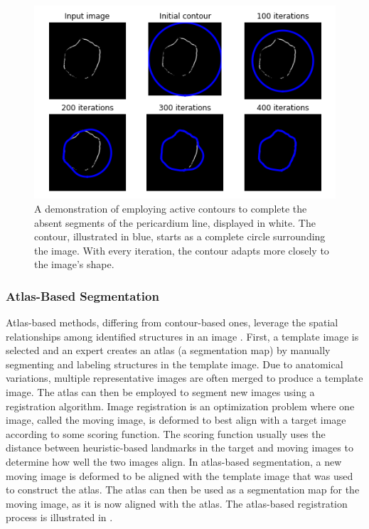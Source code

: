  \begin{figure}[t!]
 \centering
 \includegraphics[width=0.65\linewidth]{images/active_contour.png}
 \caption{A demonstration of employing active contours to complete the absent segments of the pericardium line, displayed in white. The contour, illustrated in blue, starts as a complete circle surrounding the image. With every iteration, the contour adapts more closely to the image's shape. \cite{bencevicRecentProgressEpicardial2022}}
 \label{fig:active-contour}
 \end{figure}

\subsubsection{Atlas-Based Segmentation}

Atlas-based methods, differing from contour-based ones, leverage the spatial relationships among identified structures in an image \citep{Rohlfing2005}. First, a template image is selected and an expert creates an atlas (a segmentation map) by manually segmenting and labeling structures in the template image. Due to anatomical variations, multiple representative images are often merged to produce a template image. The atlas can then be employed to segment new images using a registration algorithm. Image registration is an optimization problem where one image, called the moving image, is deformed to best align with a target image according to some scoring function. The scoring function usually uses the distance between heuristic-based landmarks in the target and moving images to determine how well the two images align. In atlas-based segmentation, a new moving image is deformed to be aligned with the template image that was used to construct the atlas. The atlas can then be used as a segmentation map for the moving image, as it is now aligned with the atlas. The atlas-based registration process is illustrated in .

